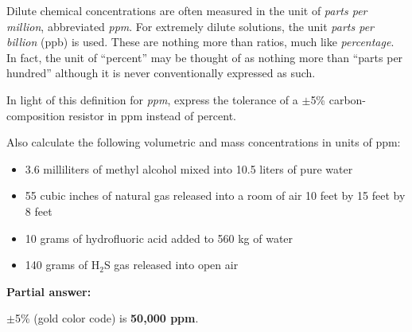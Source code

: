 

Dilute chemical concentrations are often measured in the unit of {\it parts per million}, abbreviated {\it ppm}.  For extremely dilute solutions, the unit {\it parts per billion} (ppb) is used.  These are nothing more than ratios, much like {\it percentage}.  In fact, the unit of ``percent'' may be thought of as nothing more than ``parts per hundred'' although it is never conventionally expressed as such.

\vskip 10pt

In light of this definition for {\it ppm}, express the tolerance of a $\pm$5\% carbon-composition resistor in ppm instead of percent.

\vskip 10pt

Also calculate the following volumetric and mass concentrations in units of ppm:

\begin{itemize}
\item{} 3.6 milliliters of methyl alcohol mixed into 10.5 liters of pure water
\vskip 10pt
\item{} 55 cubic inches of natural gas released into a room of air 10 feet by 15 feet by 8 feet
\vskip 10pt
\item{} 10 grams of hydrofluoric acid added to 560 kg of water
\vskip 10pt
\item{} 140 grams of H$_{2}$S gas released into open air
\end{itemize}

\vskip 10pt







\noindent
{\bf Partial answer:}

\vskip 10pt

$\pm$5\% (gold color code) is {\bf 50,000 ppm}.

